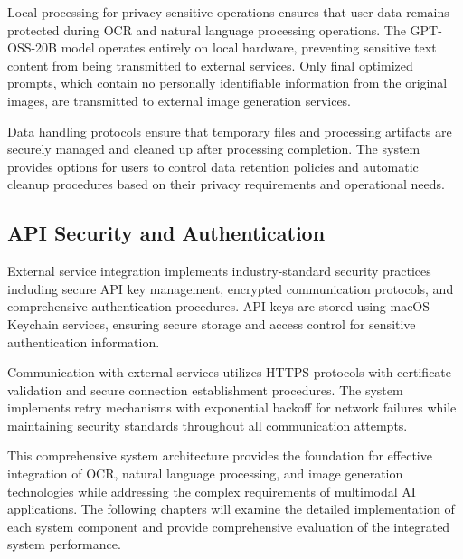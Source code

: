 Local processing for privacy-sensitive operations ensures that user data remains protected during OCR and natural language processing operations. The GPT-OSS-20B model operates entirely on local hardware, preventing sensitive text content from being transmitted to external services. Only final optimized prompts, which contain no personally identifiable information from the original images, are transmitted to external image generation services.

Data handling protocols ensure that temporary files and processing artifacts are securely managed and cleaned up after processing completion. The system provides options for users to control data retention policies and automatic cleanup procedures based on their privacy requirements and operational needs.

\subsection{API Security and Authentication}

External service integration implements industry-standard security practices including secure API key management, encrypted communication protocols, and comprehensive authentication procedures. API keys are stored using macOS Keychain services, ensuring secure storage and access control for sensitive authentication information.

Communication with external services utilizes HTTPS protocols with certificate validation and secure connection establishment procedures. The system implements retry mechanisms with exponential backoff for network failures while maintaining security standards throughout all communication attempts.

This comprehensive system architecture provides the foundation for effective integration of OCR, natural language processing, and image generation technologies while addressing the complex requirements of multimodal AI applications. The following chapters will examine the detailed implementation of each system component and provide comprehensive evaluation of the integrated system performance.